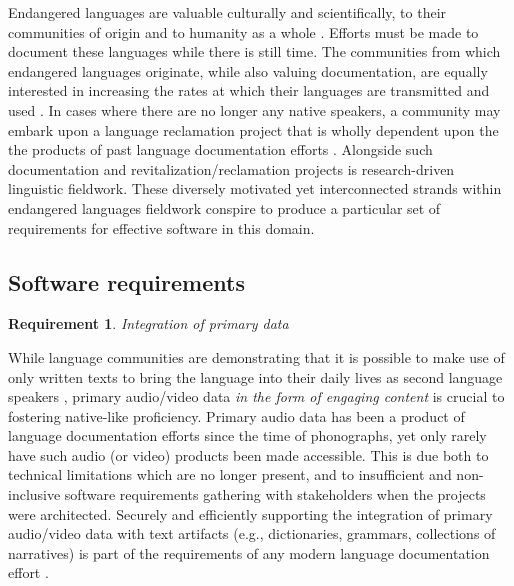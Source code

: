 \documentclass[11pt]{article}
\newcommand{\smalltodo}[2][]
    {\todo[caption={#2}, #1]
    {\tiny#2\normalsize}}
\newtheorem{requirement}{Requirement}
\begin{document}
Endangered languages are valuable culturally and scientifically, to their
communities of origin \cite{Ironstrack:2012} and to humanity as a whole
\cite{harrison2007languages}. Efforts must be made to document these languages
while there is still time. The communities from which endangered languages
originate, while also valuing documentation, are equally interested in
increasing the rates at which their languages are transmitted and used
\cite{Myaamia:2001}. In cases where there are no longer any native speakers, a
community may embark upon a language reclamation project that is wholly
dependent upon the the products of past language documentation efforts
\cite{Leonard:2012,Costa:2012}. Alongside such documentation and
revitalization/reclamation projects is research-driven linguistic fieldwork.
These diversely motivated yet interconnected strands within endangered
languages fieldwork conspire to produce a particular set of requirements for
effective software in this domain.


\subsection{Software requirements}
\label{sec:requirements}


\begin{requirement}
	\label{req:primary-data}
       Integration of primary data
\end{requirement}


While language communities are demonstrating that it is possible to make use of
only written texts to bring the language into their daily lives as second
language speakers \cite{Ironstrack:2012}, primary audio/video data \emph{in the
form of engaging content} is crucial to fostering native-like proficiency.
Primary audio data has been a product of language documentation efforts since
the time of phonographs, yet only rarely have such audio (or video) products been
made accessible. This is due both to technical limitations
which are no longer present, and to insufficient and non-inclusive software
requirements gathering with stakeholders when the projects were architected.
Securely and efficiently supporting the integration of primary audio/video data
with text artifacts (e.g., dictionaries, grammars, collections of narratives)
is part of the requirements of any modern language documentation effort
\cite{Schroeter:2006} \cite{Good:2012b}. 
\end{document}
